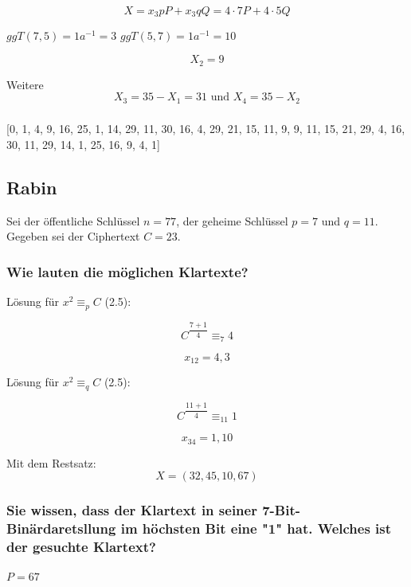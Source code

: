 \begin{equation}
	X = x_3 p P + x_3 q Q = 4 \cdot 7 P + 4 \cdot 5 Q
\end{equation}

$ggT(7,5)=1 a^{-1} = 3$
$ggT(5,7)=1 a^{-1} = 10$

\[	X_2 = 9\]

Weitere \[X_3 = 35-X_1 = 31 \text{ und } X_4 = 35-X_2 \]

\subsubsection{}
[0, 1, 4, 9, 16, 25, 1, 14, 29, 11, 30, 16, 4, 29, 21, 15, 11, 9, 9, 11, 15, 21, 29, 4, 16, 30, 11, 29, 14, 1, 25, 16, 9, 4, 1]

\subsection{Rabin}

Sei der öffentliche Schlüssel $n=77$, der geheime Schlüssel $p=7$ und $q=11$.
Gegeben sei der Ciphertext $C = 23$.


\subsubsection{Wie lauten die möglichen Klartexte?}

Lösung für $x^2 \equiv_p C$ (2.5):    

\begin{equation}
	C^{\dfrac{7+1}{4}} \equiv_7  4
\end{equation}

\[ x_{12} = 4,3 \]

\noindent
Lösung für $x^2 \equiv_q C$ (2.5):    

\begin{equation}
	C^{\dfrac{11+1}{4}} \equiv_11  1
\end{equation}



\[ x_{34} = 1,10 \]

Mit dem Restsatz: \[X = (32,45,10,67)\]

\subsubsection{Sie wissen, dass der Klartext in seiner 7-Bit-Binärdaretsllung im höchsten Bit
eine "1" hat. Welches ist der gesuchte Klartext?}

$P=67$

